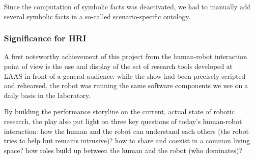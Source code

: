 Since the computation of symbolic facts was deactivated, we had to manually add
several symbolic facts in a so-called scenario-specific ontology.

\subsubsection{Significance for HRI}

A first noteworthy achievement of this project from the human-robot
interaction point of view is the use and display of the set of research tools
developed at LAAS in front of a general audience: while the show had been
precisely scripted and rehearsed, the robot was running the same software
components we use on a daily basis in the laboratory.

By building the performance storyline on the current, actual state of robotic
research,  the play also put light on three key questions of today's
human-robot interaction: how the human and the robot can understand each others
(the robot tries to help but remains intrusive)? how to share and coexist in a
common living space? how roles build up between the human and the robot (who
dominates)?

